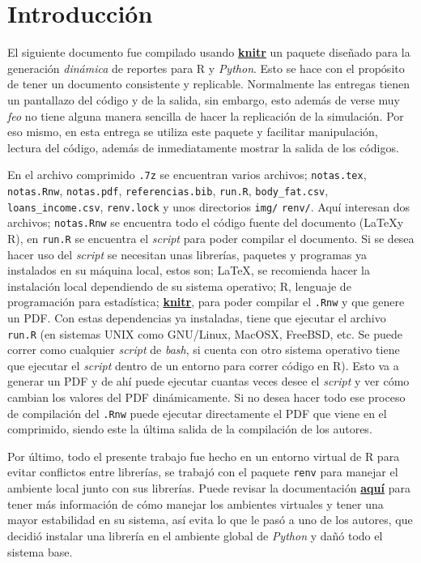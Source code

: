 \documentclass[12pt]{article}\usepackage[]{graphicx}\usepackage[]{xcolor}
\begin{document}
\section{Introducción}

El siguiente documento fue compilado usando \href{https://yihui.org/knitr/}{\textbf{knitr}} un paquete diseñado para la generación \textit{dinámica} de reportes para \textsf{R} y \textit{Python}. Esto se hace con el propósito de tener un documento consistente y replicable. Normalmente las entregas tienen un pantallazo del código y de la salida, sin embargo, esto además de verse muy \textit{feo} no tiene alguna manera sencilla de hacer la replicación de la simulación. Por eso mismo, en esta entrega se utiliza este paquete y facilitar manipulación, lectura del código, además de inmediatamente mostrar la salida de los códigos.

En el archivo comprimido \texttt{.7z} se encuentran varios archivos; \texttt{notas.tex}, \texttt{notas.Rnw}, \texttt{notas.pdf}, \texttt{referencias.bib}, \texttt{run.R}, \texttt{body\_fat.csv}, \texttt{loans\_income.csv}, \texttt{renv.lock} y unos directorios \texttt{img/} \texttt{renv/}. Aquí interesan dos archivos; \texttt{notas.Rnw} se encuentra todo el código fuente del documento (\LaTeX y \textsf{R}), en \texttt{run.R} se encuentra el \textit{script} para poder compilar el documento. Si se desea hacer uso del \textit{script} se necesitan unas librerías, paquetes y programas ya instalados en su máquina local, estos son; \LaTeX, se recomienda hacer la instalación local dependiendo de su sistema operativo; \textsf{R}, lenguaje de programación para estadística; \href{https://yihui.org/knitr/}{\textbf{knitr}}, para poder compilar el \texttt{.Rnw} y que genere un PDF. Con estas dependencias ya instaladas, tiene que ejecutar el archivo \texttt{run.R} (en sistemas UNIX como GNU/Linux, MacOSX, FreeBSD, etc. Se puede correr como cualquier \textit{script} de \textit{bash}, si cuenta con otro sistema operativo tiene que ejecutar el \textit{script} dentro de un entorno para correr código en \textsf{R}). Esto va a generar un PDF y de ahí puede ejecutar cuantas veces desee el \textit{script} y ver cómo cambian los valores del PDF dinámicamente. Si no desea hacer todo ese proceso de compilación del \texttt{.Rnw} puede ejecutar directamente el PDF que viene en el comprimido, siendo este la última salida de la compilación de los autores. 

Por último, todo el presente trabajo fue hecho en un entorno virtual de \textsf{R} para evitar conflictos entre librerías, se trabajó con el paquete \lstinline|renv| para manejar el ambiente local junto con sus librerías. Puede revisar la documentación \href{https://rstudio.github.io/renv/articles/renv.html}{\textbf{aquí}} para tener más información de cómo manejar los ambientes virtuales y tener una mayor estabilidad en su sistema, así evita lo que le pasó a uno de los autores, que decidió instalar una librería en el ambiente global de \textit{Python} y dañó todo el sistema base.
\end{document}
